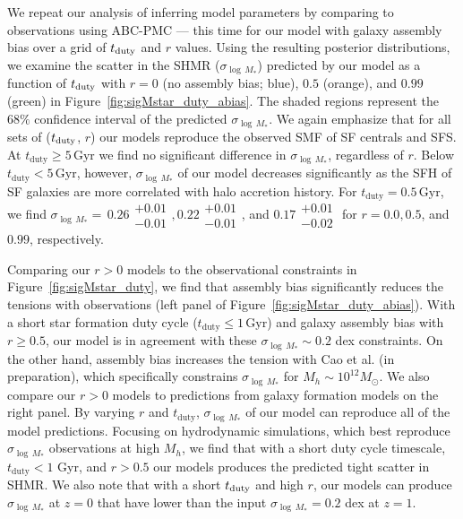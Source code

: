 \documentclass[12pt, letterpaper, preprint, tighten]{aastex62}
\newcommand{\edt}[1]{{\color{dred}{\bf} #1}}
\newcommand{\tduty}{t_{\rm duty}}
\begin{document}
We repeat our analysis of inferring model parameters by comparing to observations
using ABC-PMC --- this time for our model with galaxy assembly bias over a grid of
$t_{\rm duty}$ and $r$ values. Using the resulting posterior distributions, we
examine the scatter in the SHMR ($\sigma_{\log\,M_*}$) predicted by our model as a
function of $t_{\rm duty}$ with $r=0$ (no assembly bias; blue), $0.5$ (orange),
and $0.99$ (green) in Figure~\ref{fig:sigMstar_duty_abias}. The shaded regions
represent the $68\%$ confidence interval of the predicted $\sigma_{\log\,M_*}$.
We again emphasize that for all sets of ($t_{\rm duty}$, $r$) our models reproduce
the observed SMF of SF centrals and SFS.  At $t_\mathrm{duty} \geq 5\,\mathrm{Gyr}$
we find no significant difference in $\sigma_{\log\,M_*}$, regardless of $r$.
Below $t_\mathrm{duty} < 5\,\mathrm{Gyr}$, however, $\sigma_{\log\,M_*}$ of our
model decreases significantly as the SFH of SF galaxies are more correlated
with halo accretion history.  For $t_\mathrm{duty} = 0.5\,\mathrm{Gyr}$, we find
$\sigma_{\log\,M_*}{=}\,0.26\substack{+0.01\\-0.01},
0.22\substack{+0.01\\-0.01}$, and $0.17\substack{+0.01\\-0.02} $
for $r = 0.0, 0.5$, and $0.99$, respectively.

\edt{Comparing our $r > 0$ models to the observational constraints in
Figure~\ref{fig:sigMstar_duty}, we find that assembly bias significantly
reduces the tensions with observations (left panel of
Figure~\ref{fig:sigMstar_duty_abias})}.
With a short star formation duty cycle ($t_\mathrm{duty} \leq 1\,\mathrm{Gyr}$)
and galaxy assembly bias with $r \ge 0.5$, our model is in agreement with
these $\sigma_{\log\,M_*} \sim 0.2$ dex constraints. On the other hand,
assembly bias increases the tension with
\edt{Cao et al. (in preparation), which specifically constrains $\sigma_{\log\,M_*}$
for $M_h\sim 10^{12}M_\odot$. We also compare our $r > 0$ models to
predictions from galaxy formation models on the right panel.}
By varying $r$ and $t_\mathrm{duty}$, $\sigma_{\log\,M_*}$ of our model
can reproduce all of the model predictions.
\edt{Focusing on hydrodynamic simulations, which best reproduce $\sigma_{\log\,M_*}$
observations at high $M_h$, we find that with a short duty cycle timescale,
$t_\mathrm{duty} < 1$ Gyr, and $r > 0.5$ our models produces the predicted tight
scatter in SHMR. We also note that with a short $\tduty$ and high $r$, our
models can produce $\sigma_{\log\,M_*}$ at $z=0$ that have lower than the input
$\sigma_{\log\,M_*} = 0.2$ dex at $z=1$.
}
\end{document}

